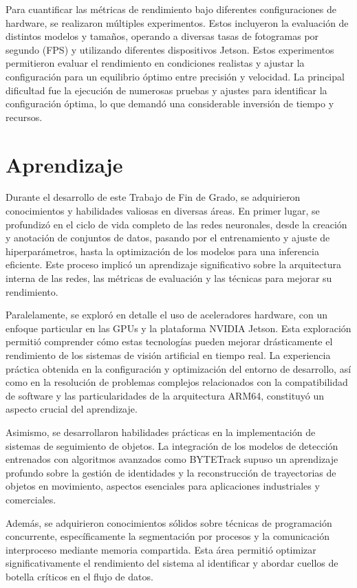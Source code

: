 \documentclass[11pt,spanish,listoffigures,listoftables]{tfgetsinf}
\begin{document}
Para cuantificar las métricas de rendimiento bajo diferentes configuraciones de hardware, se realizaron múltiples experimentos. Estos incluyeron la evaluación de distintos modelos y tamaños, operando a diversas tasas de fotogramas por segundo (FPS) y utilizando diferentes dispositivos Jetson. Estos experimentos permitieron evaluar el rendimiento en condiciones realistas y ajustar la configuración para un equilibrio óptimo entre precisión y velocidad. La principal dificultad fue la ejecución de numerosas pruebas y ajustes para identificar la configuración óptima, lo que demandó una considerable inversión de tiempo y recursos.
\section{Aprendizaje}

Durante el desarrollo de este Trabajo de Fin de Grado, se adquirieron conocimientos y habilidades valiosas en diversas áreas. En primer lugar, se profundizó en el ciclo de vida completo de las redes neuronales, desde la creación y anotación de conjuntos de datos, pasando por el entrenamiento y ajuste de hiperparámetros, hasta la optimización de los modelos para una inferencia eficiente. Este proceso implicó un aprendizaje significativo sobre la arquitectura interna de las redes, las métricas de evaluación y las técnicas para mejorar su rendimiento.

Paralelamente, se exploró en detalle el uso de aceleradores hardware, con un enfoque particular en las GPUs y la plataforma NVIDIA Jetson. Esta exploración permitió comprender cómo estas tecnologías pueden mejorar drásticamente el rendimiento de los sistemas de visión artificial en tiempo real. La experiencia práctica obtenida en la configuración y optimización del entorno de desarrollo, así como en la resolución de problemas complejos relacionados con la compatibilidad de software y las particularidades de la arquitectura ARM64, constituyó un aspecto crucial del aprendizaje.

Asimismo, se desarrollaron habilidades prácticas en la implementación de sistemas de seguimiento de objetos. La integración de los modelos de detección entrenados con algoritmos avanzados como BYTETrack supuso un aprendizaje profundo sobre la gestión de identidades y la reconstrucción de trayectorias de objetos en movimiento, aspectos esenciales para aplicaciones industriales y comerciales.

Además, se adquirieron conocimientos sólidos sobre técnicas de programación concurrente, específicamente la segmentación por procesos y la comunicación interproceso mediante memoria compartida. Esta área permitió optimizar significativamente el rendimiento del sistema al identificar y abordar cuellos de botella críticos en el flujo de datos.
\end{document}
